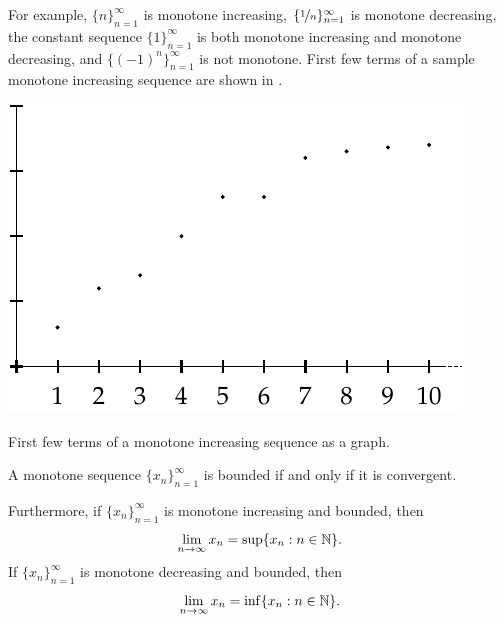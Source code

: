 For example,
$\{ n \}_{n=1}^\infty$ is monotone increasing,
$\{ \nicefrac{1}{n} \}_{n=1}^\infty$ is monotone decreasing,
the constant sequence $\{ 1 \}_{n=1}^\infty$ is both monotone increasing and monotone
decreasing, and $\bigl\{ {(-1)}^n \bigr\}_{n=1}^\infty$ is not monotone.
First few terms of a sample monotone increasing sequence
are shown in 
.

\begin{myfigureht}
\includegraphics{figures/sequence-increasing}
\caption{First few terms of a monotone increasing sequence as a
graph.\label{figsequenceincreasing}}
\end{myfigureht}

\begin{thm} \label{thm:monotoneconv}
%
A monotone sequence $\{ x_n \}_{n=1}^\infty$ is bounded if and only if it is convergent.

Furthermore, if $\{ x_n \}_{n=1}^\infty$ is monotone increasing and bounded, then
\begin{equation*}
\lim_{n\to \infty} x_n = \sup \{ x_n : n \in {\mathbb{N}} \} .
\end{equation*}
If $\{ x_n \}_{n=1}^\infty$ is monotone decreasing and bounded, then
\begin{equation*}
\lim_{n\to \infty} x_n = \inf \{ x_n : n \in {\mathbb{N}} \} .
\end{equation*}
\end{thm}

